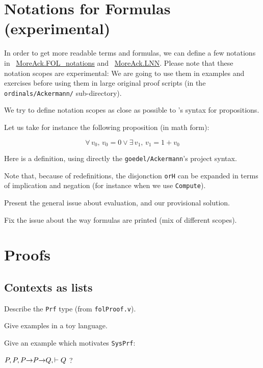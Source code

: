 \section{Notations for Formulas (experimental)}

In order to get more readable terms and formulas, we can define a few notations in ~\href{../theories/html/hydras.MoreAck.FOL_notations.html}{MoreAck.FOL\_notations} and
~\href{../theories/html/hydras.MoreAck.LNN.html}{MoreAck.LNN}.
Please note that these notation scopes are experimental: We are going to use them in examples and exercises before using them in large original proof scripts (in the \texttt{ordinals/Ackermann/} sub-directory).

We try to define notation scopes as close as possible to \coq's syntax for propositions.

Let us take for instance the following proposition (in math form):

$$\forall\, v_0,\, v_0=0\vee \exists\,v_1,\,v_1=1+v_0$$

Here is a definition, using directly the \texttt{goedel/Ackermann}'s project syntax.


Note that, because of redefinitions, the disjonction \texttt{orH}
can be expanded in terms of  implication and negation (for instance when we use \texttt{Compute}).

\begin{todo}
  Present the general issue about evaluation, and our provisional solution.
\end{todo}


\begin{todo}
Fix the issue about the way formulas are printed (mix of different scopes).
\end{todo}







\section{Proofs}

\subsection{Contexts as lists}
\begin{todo}
Describe the \texttt{Prf} type (from \texttt{folProof.v}).

Give examples in a toy language.

Give an example which motivates \texttt{SysPrf}:

$P,P , P\mbox{$\rightarrow$} P \mbox{$\rightarrow$} Q, \vdash Q$ ?
\end{todo}

